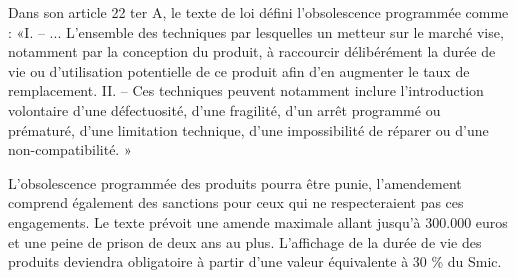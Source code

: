 Dans son article 22 ter A, le texte de loi défini l’obsolescence programmée comme :
«I. – ... L’ensemble des techniques par lesquelles un metteur sur le marché vise, notamment par la conception du produit, à raccourcir délibérément la durée de vie ou d’utilisation potentielle de ce produit afin d’en augmenter le taux de remplacement.
II. – Ces techniques peuvent notamment inclure l’introduction volontaire d’une défectuosité, d’une fragilité, d’un arrêt programmé ou prématuré, d’une limitation technique, d’une impossibilité de réparer ou d’une non-compatibilité. »

L’obsolescence programmée des produits pourra être punie, l’amendement comprend également des sanctions pour ceux qui ne respecteraient pas ces engagements. Le texte prévoit une amende maximale allant jusqu'à 300.000 euros et une peine de prison de deux ans au plus. L'affichage de la durée de vie des produits deviendra obligatoire à partir d'une valeur équivalente à 30 \% du Smic.